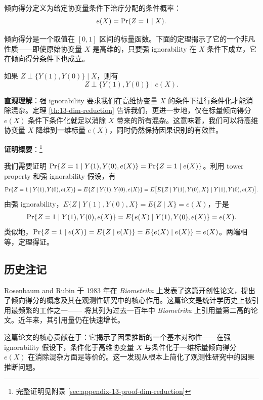 \begin{Definition}[倾向得分]\label{def:13-pscore}
倾向得分定义为给定协变量条件下治疗分配的条件概率：
\[
e(X) = \operatorname{Pr}(Z = 1 \mid X).
\]
\end{Definition}

倾向得分是一个取值在 $[0,1]$ 区间的标量函数。下面的定理揭示了它的一个非凡性质——即使原始协变量 $X$ 是高维的，只要强 ignorability 在 $X$ 条件下成立，它在倾向得分条件下也成立。

\begin{Theorem}[倾向得分的维度约化定理]\label{th:11.1}
如果 $Z \perp \{Y(1), Y(0)\} \mid X$，则有
\[
Z \perp \{Y(1), Y(0)\} \mid e(X).
\]
\label{th:13-dim-reduction}
\end{Theorem}

\textbf{直观理解}：强 ignorability 要求我们在高维协变量 $X$ 的条件下进行条件化才能消除混杂。定理 \ref{th:13-dim-reduction} 告诉我们，更进一步地，仅在标量倾向得分 $e(X)$ 条件下条件化就足以消除 $X$ 带来的所有混杂。这意味着，我们可以将高维协变量 $X$ 降维到一维标量 $e(X)$，同时仍然保持因果识别的有效性。

\textbf{证明概要}：\footnote{完整证明见附录 \cref{sec:appendix-13-proof-dim-reduction}}

我们需要证明 $\operatorname{Pr}\{Z=1 \mid Y(1), Y(0), e(X)\} = \operatorname{Pr}\{Z=1 \mid e(X)\}$。利用 tower property 和强 ignorability 假设，有
\[
\operatorname{Pr}\{Z=1 \mid Y(1), Y(0), e(X)\} = E\{Z \mid Y(1), Y(0), e(X)\} = E\big[E\{Z \mid Y(1), Y(0), X\} \mid Y(1), Y(0), e(X)\big].
\]
由强 ignorability，$E\{Z \mid Y(1), Y(0), X\} = E\{Z \mid X\} = e(X)$，于是
\[
\operatorname{Pr}\{Z=1 \mid Y(1), Y(0), e(X)\} = E\{e(X) \mid Y(1), Y(0), e(X)\} = e(X).
\]
类似地，$\operatorname{Pr}\{Z=1 \mid e(X)\} = E\{Z \mid e(X)\} = E\{e(X) \mid e(X)\} = e(X)$。两端相等，定理得证。

\subsection{历史注记}\label{sec:13-history}

Rosenbaum and Rubin 于 1983 年在 \textit{Biometrika} 上发表了这篇开创性论文，提出了倾向得分的概念及其在观测性研究中的核心作用。这篇论文是统计学历史上被引用最频繁的工作之一——\citet{Titterington:2013} 将其列为过去一百年中 \textit{Biometrika} 上引用量第二高的论文。近年来，其引用量仍在快速增长。

这篇论文的核心贡献在于：它揭示了因果推断的一个基本对称性——在强 ignorability 假设下，条件化于高维协变量 $X$ 与条件化于一维标量倾向得分 $e(X)$ 在消除混杂方面是等价的。这一发现从根本上简化了观测性研究中的因果推断问题。

